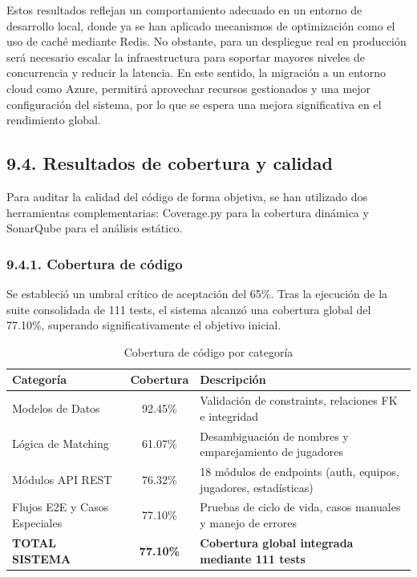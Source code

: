 Estos resultados reflejan un comportamiento adecuado en un entorno de desarrollo local, donde ya se han aplicado mecanismos de
 optimización como el uso de caché mediante Redis. No obstante, para un despliegue real en producción será
  necesario escalar la infraestructura para soportar mayores niveles de concurrencia y reducir la latencia.
   En este sentido, la migración a un entorno cloud como Azure, permitirá
    aprovechar recursos gestionados y una mejor configuración del sistema, por lo que se espera una mejora significativa 
    en el rendimiento global.


\subsection{9.4. Resultados de cobertura y calidad}

Para auditar la calidad del código de forma objetiva, se han 
utilizado dos herramientas complementarias: Coverage.py para la 
cobertura dinámica y SonarQube para el análisis estático.


\subsubsection{9.4.1. Cobertura de código}

Se estableció un umbral crítico de aceptación del 65\%. Tras la 
ejecución de la suite consolidada de 111 tests, el sistema alcanzó 
una cobertura global del 77.10\%, superando significativamente el 
objetivo inicial.

\begin{table}[H]
\centering
\small
\begin{tabular}{|p{3.5cm}|c|p{5cm}|}
\hline
\textbf{Categoría} & \textbf{Cobertura} & \textbf{Descripción} \\
\hline
Modelos de Datos & 92.45\% & Validación de constraints, 
relaciones FK e integridad \\
\hline
Lógica de Matching & 61.07\% & Desambiguación de nombres y 
emparejamiento de jugadores \\
\hline
Módulos API REST & 76.32\% & 18 módulos de endpoints (auth, 
equipos, jugadores, estadísticas) \\
\hline
Flujos E2E y Casos Especiales & 77.10\% & Pruebas de ciclo de vida, 
casos manuales y manejo de errores \\
\hline
\textbf{TOTAL SISTEMA} & \textbf{77.10\%} & \textbf{Cobertura global 
integrada mediante 111 tests} \\
\hline
\end{tabular}
\caption{Cobertura de código por categoría}
\end{table}

